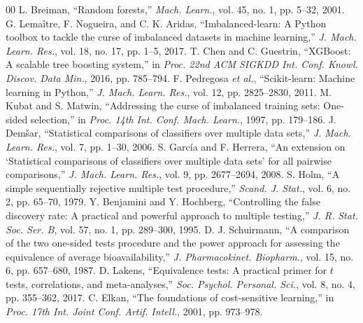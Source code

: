 \documentclass[conference,a4paper]{IEEEtran}
\begin{document}
\begin{thebibliography}{00}
 L. Breiman, ``Random forests,'' \textit{Mach. Learn.}, vol. 45, no. 1, pp. 5--32, 2001.
 G. Lema\^itre, F. Nogueira, and C. K. Aridas, ``Imbalanced-learn: A Python toolbox to tackle the curse of imbalanced datasets in machine learning,'' \textit{J. Mach. Learn. Res.}, vol. 18, no. 17, pp. 1--5, 2017.
 T. Chen and C. Guestrin, ``XGBoost: A scalable tree boosting system,'' in \textit{Proc. 22nd ACM SIGKDD Int. Conf. Knowl. Discov. Data Min.}, 2016, pp. 785--794.
 F. Pedregosa \textit{et al.}, ``Scikit-learn: Machine learning in Python,'' \textit{J. Mach. Learn. Res.}, vol. 12, pp. 2825--2830, 2011.
 M. Kubat and S. Matwin, ``Addressing the curse of imbalanced training sets: One-sided selection,'' in \textit{Proc. 14th Int. Conf. Mach. Learn.}, 1997, pp. 179--186.
 J. Dem\v{s}ar, ``Statistical comparisons of classifiers over multiple data sets,'' \textit{J. Mach. Learn. Res.}, vol. 7, pp. 1--30, 2006.
 S. Garc\'ia and F. Herrera, ``An extension on `Statistical comparisons of classifiers over multiple data sets' for all pairwise comparisons,'' \textit{J. Mach. Learn. Res.}, vol. 9, pp. 2677--2694, 2008.
 S. Holm, ``A simple sequentially rejective multiple test procedure,'' \textit{Scand. J. Stat.}, vol. 6, no. 2, pp. 65--70, 1979.
 Y. Benjamini and Y. Hochberg, ``Controlling the false discovery rate: A practical and powerful approach to multiple testing,'' \textit{J. R. Stat. Soc. Ser. B}, vol. 57, no. 1, pp. 289--300, 1995.
 D. J. Schuirmann, ``A comparison of the two one-sided tests procedure and the power approach for assessing the equivalence of average bioavailability,'' \textit{J. Pharmacokinet. Biopharm.}, vol. 15, no. 6, pp. 657--680, 1987.
 D. Lakens, ``Equivalence tests: A practical primer for $t$ tests, correlations, and meta-analyses,'' \textit{Soc. Psychol. Personal. Sci.}, vol. 8, no. 4, pp. 355--362, 2017.
 C. Elkan, ``The foundations of cost-sensitive learning,'' in \textit{Proc. 17th Int. Joint Conf. Artif. Intell.}, 2001, pp. 973--978.
\end{thebibliography}
\end{document}
